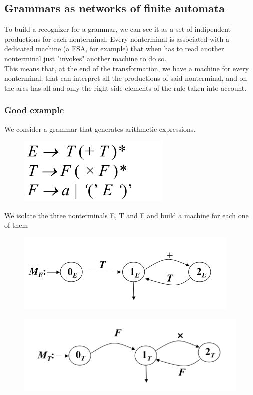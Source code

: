		\subsection{Grammars as networks of finite automata}
			To build a recognizer for a grammar, we can see it as a set of indipendent productions for each nonterminal. Every nonterminal is associated with a dedicated machine (a FSA, for example) that when has to read another nonterminal just "invokes" another machine to do so.\\
			This means that, at the end of the transformation, we have a machine for every nonterminal, that can interpret all the productions of said nonterminal, and on the arcs has all and only the right-side elements of the rule taken into account.\\
			
			\subsubsection{Good example}
				We consider a grammar that generates arithmetic expressions.
				\begin{figure}[htp]
					\begin{center}
						\includegraphics[]{./images/exGrammar.png}
					\end{center}
				\end{figure}
				We isolate the three nonterminals E, T and F and build a machine for each one of them
				\begin{figure}[htp]
					\begin{center}
						\includegraphics[]{./images/exE.png}
					\end{center}
				\end{figure}
				\begin{figure}[htp]
					\begin{center}
						\includegraphics[]{./images/exT.png}
					\end{center}
				\end{figure}
